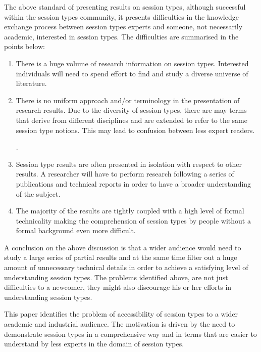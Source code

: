 The above standard of presenting results on session types,
although successful within the session types community,
it presents difficulties in the knowledge exchange process between 
session types experts and someone, not necessarily academic, interested
in session types. The difficulties are summarised in the points
below:
%
\begin{enumerate}
	\item	There is a huge volume of research information on session types.
			Interested individuals will need to spend effort to find
			and study a diverse universe of literature.

	\item	There is no uniform approach and/or terminology
			in the presentation of research results.
			Due to the diversity of session types,
			there are may terms that derive from different
			disciplines and are extended to refer to
			the same session type notions.
			This may lead to confusion between less
			expert readers.

			.

	\item	Session type results are often presented in
			isolation with respect to other results.
			A researcher will have to perform research
			following a series of publications and
			technical reports in order to have a broader
			understanding of the subject.

	\item	The majority of the results are tightly coupled
			with a high level of formal technicality making the
			comprehension of session types by people without
			a formal background even more difficult.
\end{enumerate}
%
A conclusion on the above discussion is that a wider
audience would need to study a large series of partial
results and at the same time filter out a huge amount
of unnecessary technical details in order to achieve a satisfying
level of understanding session types.
The problems identified above, are not just difficulties
to a newcomer, they might also discourage his or her
efforts in understanding session types.

This paper identifies the problem of accessibility of session
types to a wider academic and industrial audience.
The motivation is driven by the need to demonstrate session
types in a comprehensive way and in terms that are easier to
understand by less experts in the domain of session types.

